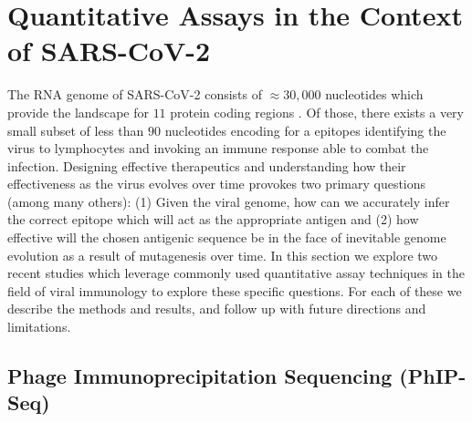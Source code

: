 \documentclass{article}
\begin{document}
\section*{Quantitative Assays in the Context of SARS-CoV-2}

The RNA genome of SARS-CoV-2 consists of $\approx 30,000$ nucleotides which provide the landscape for $11$ protein coding regions \citep{Naqvi2020}.
Of those, there exists a very small subset of less than $90$ nucleotides encoding for a epitopes identifying the virus to lymphocytes and invoking an immune response able to combat the infection.
Designing effective therapeutics and understanding how their effectiveness as the virus evolves over time provokes two primary questions (among many others):
(1) Given the viral genome, how can we accurately infer the correct epitope which will act as the appropriate antigen and 
(2) how effective will the chosen antigenic sequence be in the face of inevitable genome evolution as a result of mutagenesis over time.
In this section we explore two recent studies which leverage commonly used quantitative assay techniques in the field of viral immunology to explore these specific questions. 
For each of these we describe the methods and results, and follow up with future directions and limitations.

\subsection*{Phage Immunoprecipitation Sequencing (PhIP-Seq)}
\end{document}
